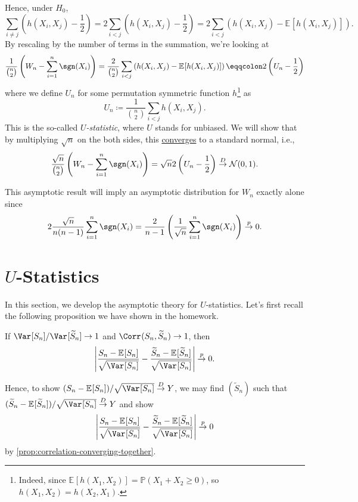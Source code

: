 Hence, under \(H_0\),
\[
	\sum_{i \neq j} \left( h(X_i, X_j) - \frac{1}{2} \right)
	= 2 \sum_{i < j} \left( h(X_i, X_j) - \frac{1}{2} \right)
	= 2 \sum_{i < j} \left( h(X_i, X_j) - \mathbb{E}_{}[h(X_i, X_j)] \right).
\]
By rescaling by the number of terms in the summation, we're looking at
\[
	\frac{1}{\binom{n}{2}} \left( W_n - \sum_{i=1}^{n} \sgn (X_i) \right)
	= \frac{2}{\binom{n}{2}} \sum_{i < j} \left( h(X_i, X_j) - \mathbb{E}_{}[h(X_i, X_j)] \right)
	\eqqcolon 2 \left( U_n - \frac{1}{2} \right)
\]
where we define \(U_n\) for some permutation symmetric function \(h\)\footnote{Indeed, since \(\mathbb{E}_{}[h(X_1, X_2)] = \mathbb{P} (X_1 + X_2 \geq 0)\), so \(h(X_1, X_2) = h(X_2, X_1)\).} as
\[
	U_n \coloneqq \frac{1}{\binom{n}{2}} \sum_{i < j} h(X_i, X_j).
\]
This is the so-called \emph{\(U\)-statistic}, where \(U\) stands for unbiased. We will show that by multiplying \(\sqrt{n} \) on the both sides, this \hyperref[def:converge-in-distribution]{converges} to a standard normal, i.e.,
\begin{equation}\label{eq:Wilcoxon-signed-rank-test}
	\frac{\sqrt{n}}{\binom{n}{2}}  \left( W_n - \sum_{i=1}^{n} \sgn (X_i) \right)
	= \sqrt{n} 2 \left( U_n - \frac{1}{2} \right)
	\overset{D}{\to} \mathcal{N} (0, 1).
\end{equation}

\begin{note}
	This asymptotic result will imply an asymptotic distribution for \(W_n\) exactly alone since
	\[
		2 \frac{\sqrt{n} }{n(n-1)} \sum_{i=1}^{n} \sgn (X_i)
		= \frac{2}{n-1} \left( \frac{1}{\sqrt{n} } \sum_{i=1}^{n} \sgn (X_i) \right)
		\overset{p}{\to} 0.
	\]
\end{note}

\section{\(U\)-Statistics}
In this section, we develop the asymptotic theory for \(U\)-statistics. Let's first recall the following proposition we have shown in the homework.

\begin{proposition}\label{prop:correlation-converging-together}
	If \(\Var_{}[S_n] / \Var_{}[\widetilde{S} _n] \to 1\) and \(\Corr_{}(S_n, \widetilde{S} _n) \to 1\), then
	\[
		\left\vert \frac{S_n - \mathbb{E}_{}[S_n] }{\sqrt{\Var_{}[S_n] } } - \frac{\widetilde{S} _n - \mathbb{E}_{}[\widetilde{S} _n] }{\sqrt{\Var_{}[S_n] } } \right\vert
		\overset{p}{\to} 0.
	\]
\end{proposition}

Hence, to show \((S_n - \mathbb{E}_{}[S_n] ) / \sqrt{\Var_{}[S_n] } \overset{D}{\to} Y\), we may find \((\widetilde{S} _n)\) such that \((\widetilde{S} _n - \mathbb{E}_{}[\widetilde{S} _n]) / \sqrt{\Var_{}[S_n] } \overset{D}{\to} Y\) and show
\[
	\left\vert \frac{S_n - \mathbb{E}_{}[S_n] }{\sqrt{\Var_{}[S_n] } } - \frac{\widetilde{S} _n - \mathbb{E}_{}[\widetilde{S} _n] }{\sqrt{\Var_{}[S_n] } }\right\vert
	\overset{p}{\to} 0
\]
by \autoref{prop:correlation-converging-together}.